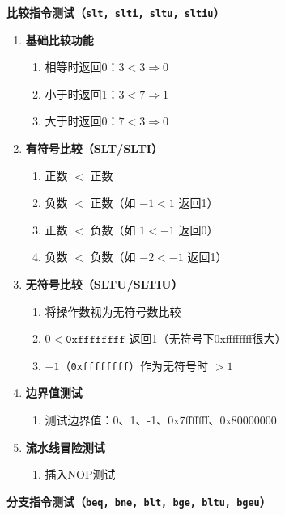 \documentclass[12pt,a4paper]{ctexart}
\newcommand{\code}[1]{\texttt{#1}}
\begin{document}
\textbf{比较指令测试（\code{slt, slti, sltu, sltiu}）}

\begin{enumerate}
    \item \textbf{基础比较功能}
    \begin{enumerate}
        \item 相等时返回0：$3 < 3 \Rightarrow 0$
        \item 小于时返回1：$3 < 7 \Rightarrow 1$
        \item 大于时返回0：$7 < 3 \Rightarrow 0$
    \end{enumerate}
    
    \item \textbf{有符号比较（SLT/SLTI）}
    \begin{enumerate}
        \item 正数 $<$ 正数
        \item 负数 $<$ 正数（如 $-1 < 1$ 返回1）
        \item 正数 $<$ 负数（如 $1 < -1$ 返回0）
        \item 负数 $<$ 负数（如 $-2 < -1$ 返回1）
    \end{enumerate}
    
    \item \textbf{无符号比较（SLTU/SLTIU）}
    \begin{enumerate}
        \item 将操作数视为无符号数比较
        \item $0 < \texttt{0xffffffff}$ 返回1（无符号下0xffffffff很大）
        \item $-\!1$（\texttt{0xffffffff}）作为无符号时 $> 1$
    \end{enumerate}
    
    \item \textbf{边界值测试}
    \begin{enumerate}
        \item 测试边界值：0、1、-1、0x7fffffff、0x80000000
    \end{enumerate}
    
    \item \textbf{流水线冒险测试}
    \begin{enumerate}
        \item 插入NOP测试
    \end{enumerate}
\end{enumerate}

\textbf{分支指令测试（\code{beq, bne, blt, bge, bltu, bgeu}）}
\end{document}
